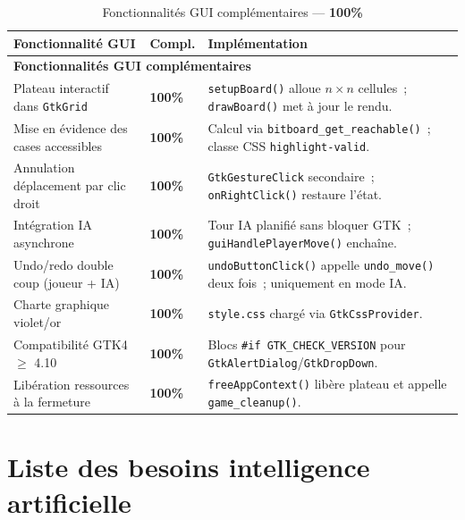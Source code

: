 \documentclass[a4paper]{article}
\begin{document}
\begin{table}[H]
\centering
\renewcommand{\arraystretch}{1.4}
\begin{tabular}{|p{6cm}|p{1.5cm}|p{8cm}|}
\hline
\textbf{Fonctionnalité GUI} & \textbf{Compl.} & \textbf{Implémentation} \\
\hline
\multicolumn{3}{|l|}{\textbf{Fonctionnalités GUI complémentaires}} \\
\hline
Plateau interactif dans \texttt{GtkGrid}
& \textbf{100\%}
& \texttt{setupBoard()} alloue $n \times n$ cellules~; \texttt{drawBoard()} met à jour le rendu. \\
\hline
Mise en évidence des cases accessibles
& \textbf{100\%}
& Calcul via \texttt{bitboard\_get\_reachable()}~; classe CSS \texttt{highlight-valid}. \\
\hline
Annulation déplacement par clic droit
& \textbf{100\%}
& \texttt{GtkGestureClick} secondaire~; \texttt{onRightClick()} restaure l'état. \\
\hline
Intégration IA asynchrone
& \textbf{100\%}
& Tour IA planifié sans bloquer GTK~; \texttt{guiHandlePlayerMove()} enchaîne. \\
\hline
Undo/redo double coup (joueur + IA)
& \textbf{100\%}
& \texttt{undoButtonClick()} appelle \texttt{undo\_move()} deux fois~; uniquement en mode IA. \\
\hline
Charte graphique violet/or
& \textbf{100\%}
& \texttt{style.css} chargé via \texttt{GtkCssProvider}. \\
\hline
Compatibilité GTK4 $\geq$ 4.10
& \textbf{100\%}
& Blocs \texttt{\#if GTK\_CHECK\_VERSION} pour \texttt{GtkAlertDialog}/\texttt{GtkDropDown}. \\
\hline
Libération ressources à la fermeture
& \textbf{100\%}
& \texttt{freeAppContext()} libère plateau et appelle \texttt{game\_cleanup()}. \\
\hline
\end{tabular}
\caption{Fonctionnalités GUI complémentaires --- \textbf{100\%}}
\label{tab:gui-bonus}
\end{table}
 
 
\section{Liste des besoins intelligence artificielle}
\label{ann:besoins-ia}
 
\end{document}

